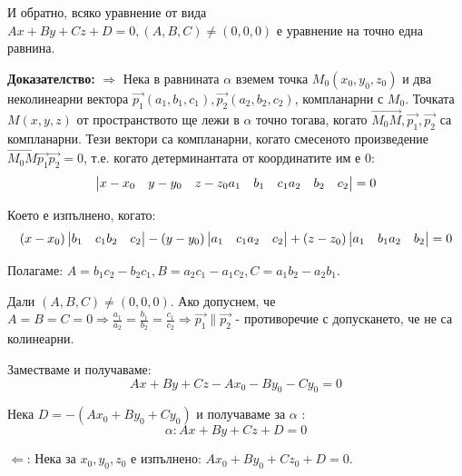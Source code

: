 \documentclass{article}
\renewcommand{\\}{\newline}
\newcommand{\doc}{\textbf{Доказателство: }}
\begin{document}
И обратно, всяко уравнение от вида \(Ax + By + Cz + D = 0, (A, B, C) \not= (0,0,0)\) е уравнение на точно една равнина.

\doc \(\Rightarrow\)  Нека в равнината \(\alpha\) вземем точка \(M_0(x_0, y_0, z_0)\) и два неколинеарни вектора \(\overrightarrow{p_1}(a_1, b_1, c_1), \overrightarrow{p_2}(a_2, b_2, c_2)\), компланарни с \(M_0\). Точката \(M(x, y, z)\) от пространството ще лежи в \(\alpha\) точно тогава, когато \(\overrightarrow{M_0M}, \overrightarrow{p_1}, \overrightarrow{p_2}\) са компланарни. Тези вектори са компланарни, когато смесеното произведение \(\overrightarrow{M_0M}\overrightarrow{p_1}\overrightarrow{p_2} = 0\), т.е. когато детерминантата от координатите им е 0: \[
  \begin{vmatrix}
    x - x_0 & y - y_0 & z - z_0 \\ 
    a_1 & b_1 & c_1 \\ 
    a_2 & b_2 & c_2
  \end{vmatrix} = 0
\]         

Което е изпълнено, когато: \[
  (x-x_0)\begin{vmatrix}
    b_1 & c_1 \\ 
    b_2 & c_2 
  \end{vmatrix} - (y-y_0)\begin{vmatrix}
    a_1 & c_1 \\ 
    a_2 & c_2 
  \end{vmatrix} + (z-z_0)\begin{vmatrix}
    a_1 & b_1 \\ 
    a_2 & b_2 
  \end{vmatrix} = 0
\]

Полагаме: \(A = b_1c_2 - b_2c_1, B = a_2c_1 - a_1c_2, C = a_1b_2 - a_2b_1\).

Дали \((A, B,C) \not= (0,0,0)\). Ако допуснем, че \(A = B = C = 0 \Rightarrow \frac{a_1}{a_2} = \frac{b_1}{b_2} = \frac{c_1}{c_2} \Rightarrow \overrightarrow{p_1} \parallel \overrightarrow{p_2}\) - противоречие с допускането, че не са колинеарни.  

Заместваме и получаваме: \[
  Ax + By + Cz - Ax_0 - By_0 - Cy_0 = 0 
\]  

Нека \(D = -(Ax_0 + By_0 + Cy_0)\) и получаваме за \(\alpha\) : \[
  \alpha: Ax + By + Cz + D = 0
\]   

\(\Leftarrow\): Нека за \(x_0, y_0, z_0\) е изпълнено: \(Ax_0 + By_0 + Cz_0 + D = 0\).
\end{document}
